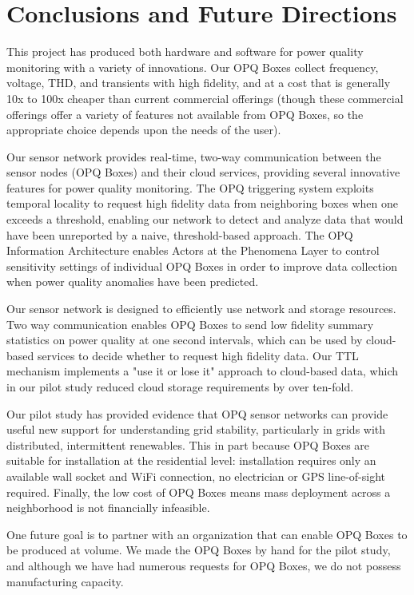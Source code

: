 \section{Conclusions and Future Directions}
\label{sec:conclusions}

This project has produced both hardware and software for power quality monitoring with a variety of innovations.  Our OPQ Boxes collect frequency, voltage, THD, and transients with high fidelity, and at a cost that is generally 10x to 100x cheaper than current commercial offerings (though these commercial offerings offer a variety of features not available from OPQ Boxes, so the appropriate choice depends upon the needs of the user).

Our sensor network provides real-time, two-way communication between the sensor nodes (OPQ Boxes) and their cloud services, providing several innovative features for power quality monitoring. The OPQ triggering system exploits temporal locality to request high fidelity data from neighboring boxes when one exceeds a threshold, enabling our network to detect and analyze data that would have been unreported by a naive, threshold-based approach. The OPQ Information Architecture enables Actors at the Phenomena Layer to control sensitivity settings of individual OPQ Boxes in order to improve data collection when power quality anomalies have been predicted.

Our sensor network is designed to efficiently use network and storage resources. Two way communication enables OPQ Boxes to send low fidelity summary statistics on power quality at one second intervals, which can be used by cloud-based services to decide whether to request high fidelity data.  Our TTL mechanism implements a "use it or lose it" approach to cloud-based data, which in our pilot study reduced cloud storage requirements by over ten-fold.

Our pilot study has provided evidence that OPQ sensor networks can provide useful new support for understanding grid stability, particularly in grids with distributed, intermittent renewables. This in part because OPQ Boxes are suitable for installation at the residential level: installation requires only an available wall socket and WiFi connection, no electrician or GPS line-of-sight required. Finally, the low cost of OPQ Boxes means mass deployment across a neighborhood is not financially infeasible.

One future goal is to partner with an organization that can enable OPQ Boxes to be produced at volume. We made the OPQ Boxes by hand for the pilot study, and although we have had numerous requests for OPQ Boxes, we do not possess manufacturing capacity.

